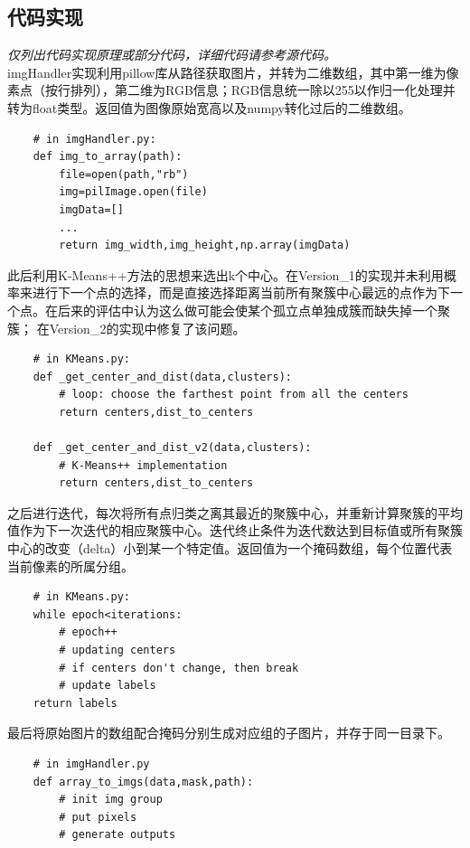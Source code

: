 \documentclass{article}
\begin{document}
\subsection{代码实现}
\textit{仅列出代码实现原理或部分代码，详细代码请参考源代码。}\\
\lstset{
    language=python,
    frame=shadowbox,
    breaklines=true
}
imgHandler实现利用pillow库从路径获取图片，并转为二维数组，其中第一维为像素点（按行排列），第二维为RGB信息；RGB信息统一除以255以作归一化处理并转为float类型。返回值为图像原始宽高以及numpy转化过后的二维数组。
\begin{lstlisting}
    # in imgHandler.py:
    def img_to_array(path):
        file=open(path,"rb")
        img=pilImage.open(file)
        imgData=[]
        ...
        return img_width,img_height,np.array(imgData)
\end{lstlisting}
\begin{newpage}
此后利用K-Means++方法的思想来选出k个中心。在Version\_1的实现并未利用概率来进行下一个点的选择，而是直接选择距离当前所有聚簇中心最远的点作为下一个点。在后来的评估中认为这么做可能会使某个孤立点单独成簇而缺失掉一个聚簇；
在Version\_2的实现中修复了该问题。
\begin{lstlisting}
    # in KMeans.py:
    def _get_center_and_dist(data,clusters):
        # loop: choose the farthest point from all the centers
        return centers,dist_to_centers

    def _get_center_and_dist_v2(data,clusters):
        # K-Means++ implementation
        return centers,dist_to_centers
\end{lstlisting}
之后进行迭代，每次将所有点归类之离其最近的聚簇中心，并重新计算聚簇的平均值作为下一次迭代的相应聚簇中心。迭代终止条件为迭代数达到目标值或所有聚簇中心的改变（delta）小到某一个特定值。返回值为一个掩码数组，每个位置代表当前像素的所属分组。
\begin{lstlisting}
    # in KMeans.py:
    while epoch<iterations:
        # epoch++
        # updating centers
        # if centers don't change, then break
        # update labels
    return labels
\end{lstlisting}
最后将原始图片的数组配合掩码分别生成对应组的子图片，并存于同一目录下。
\begin{lstlisting}
    # in imgHandler.py
    def array_to_imgs(data,mask,path):
        # init img group
        # put pixels
        # generate outputs
    
\end{lstlisting}
\end{newpage}
\end{document}
